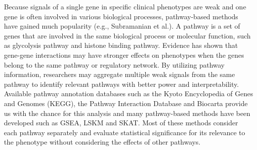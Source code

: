 \documentclass[a4paper,12pt]{article}
\begin{document}
	Because signals of a single gene in specific clinical phenotypes are weak and one gene is often involved in various biological processes, pathway-based methods have gained much popularity (e.g., Subramanian et al.).\cite{subramanian2005gene} A pathway is a set of genes that are involved in the same biological process or molecular function, such as glycolysis pathway and histone binding pathway. Evidence has shown that gene-gene interactions may have stronger effects on phenotypes when the genes belong to the same pathway or regulatory network.\cite{carlson2004mapping} By utilizing pathway information, researchers may aggregate multiple weak signals from the same pathway to identify relevant pathways with better power and interpretability. Available pathway annotation databases such as the Kyoto Encyclopedia of Genes and Genomes (KEGG), \cite{kanehisa2000kegg} the Pathway Interaction Database \cite{schaefer2008pid} and Biocarta\cite{nishimura2001biocarta} provide us with the chance for this analysis and many pathway-based methods have been developed such as GSEA,\cite{subramanian2005gene} LSKM \cite{liu2007semiparametric} and SKAT. \cite{wu2011rare} Most of these methods consider each pathway separately and evaluate statistical significance for its relevance to the phenotype without considering the effects of other pathways.
	
\end{document}
